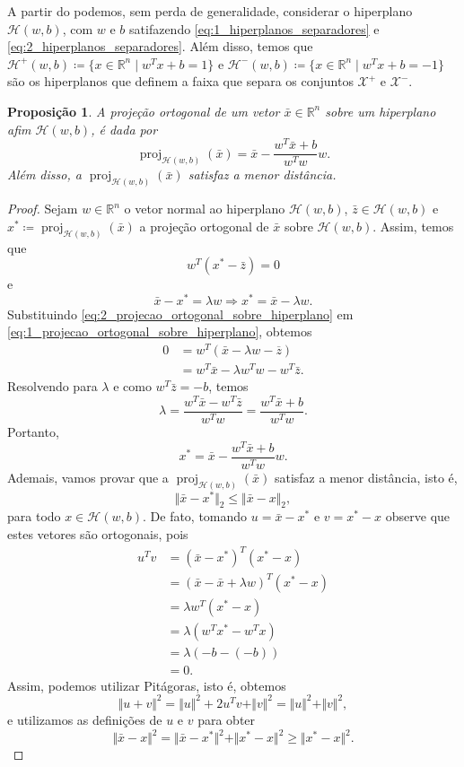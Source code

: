 \documentclass[12pt,a4paper]{scrartcl}
\DeclareMathOperator{\proj}{proj}
\def\Xset{\mathcal{X}}
\def\Hset{\mathcal{H}}
\def\RR{\mathds{R}}
\def\xbar{\bar{x}}
\newtheorem{prop}{Proposição}
\theoremstyle{definition}%
\begin{document}
A partir do  podemos, sem perda de generalidade, considerar o hiperplano $\Hset (w,b)$, com $w$ e $b$ satifazendo \eqref{eq:1_hiperplanos_separadores} e \eqref{eq:2_hiperplanos_separadores}. Além disso, temos que $\Hset^{+} (w,b) \coloneqq \{x\in \RR^n \mid w^{T}x+b= 1\}$ e $\Hset^{-} (w,b) \coloneqq \{x\in \RR^n \mid w^{T}x+b= -1\}$ são os hiperplanos que definem a faixa que separa os conjuntos $\Xset^{+}$ e $\Xset^{-}$.

\begin{prop} \label{prop:projecao_ortogonal_sobre_hiperplano} 
A projeção ortogonal de um vetor $\xbar\in \RR^n$ sobre um hiperplano afim $\Hset(w,b)$, é dada por
\[ \proj_{\Hset (w,b)}(\xbar)= \xbar - \dfrac{w^{T}\xbar+b}{w^{T}w}w. \]
Além disso, a $\proj_{\Hset (w,b)}(\xbar)$ satisfaz a menor distância.
\end{prop}

\begin{proof}
Sejam $w\in \RR^n$ o vetor normal ao hiperplano $\Hset(w,b)$, $\bar{z}\in \Hset(w,b)$ e $x^{*} \coloneqq \proj_{\Hset (w,b)}(\xbar)$ a projeção ortogonal de $\xbar$ sobre $\Hset(w,b)$. Assim, temos que 
\[ \label{eq:1_projecao_ortogonal_sobre_hiperplano} 
w^{T}(x^{*}-\bar{z})=0 
\]
e
\[ \label{eq:2_projecao_ortogonal_sobre_hiperplano} 
\xbar-x^{*}=\lambda w \Longrightarrow x^{*}=\xbar-\lambda w. 
\]
Substituindo \eqref{eq:2_projecao_ortogonal_sobre_hiperplano} em \eqref{eq:1_projecao_ortogonal_sobre_hiperplano}, obtemos
\begin{align}
0 &= w^{T}(\xbar-\lambda w-\overline{z}) \\
&= w^{T}\xbar-\lambda w^{T}w - w^{T}\bar{z}.
\end{align}
Resolvendo para $\lambda$ e como $w^{T}\bar{z} = -b$, temos
\[ \lambda =\dfrac{w^{T}\xbar-w^{T}\bar{z}}{w^{T}w} =\dfrac{w^{T}\xbar+b}{w^{T}w}. \]
Portanto, 
\[ x^{*}=\xbar-\dfrac{w^{T}\xbar+b}{w^{T}w}w . \]
Ademais, vamos provar que a $\proj_{\Hset (w,b)}(\xbar)$ satisfaz a menor distância, isto é,
\[ \Vert\xbar-x^{*}\Vert_{2} \leq \Vert \xbar-x\Vert_{2}, \]
para todo $x\in \Hset(w,b)$.
De fato, tomando $u=\xbar-x^{*}$ e $v=x^{*}-x$ observe que estes vetores são ortogonais, pois 
\begin{align}
u^{T}v&= (\xbar-x^{*})^{T}(x^{*}-x) \\
&= (\xbar-\xbar+\lambda w)^{T}(x^{*}-x) \\
&= \lambda w^{T}(x^{*}-x) \\
&= \lambda (w^{T}x^{*}-w^{T}x) \\
&= \lambda (-b-(-b)) \\
&= 0.
\end{align}
Assim, podemos utilizar Pitágoras, isto é, obtemos
\[ \Vert u+v\Vert^{2}=\Vert u\Vert^{2} + 2u^{T}v + \Vert v\Vert^{2}=\Vert u\Vert^{2} + \Vert v\Vert^{2} , \]
e utilizamos as definições de $u$ e $v$ para obter
\[ 
\Vert \xbar-x\Vert^{2}=\Vert \xbar-x^{*}\Vert^{2} + \Vert x^{*}-x\Vert^{2} \geq \Vert x^{*} - x \Vert^{2} . 
\]
\end{proof}
\end{document}
